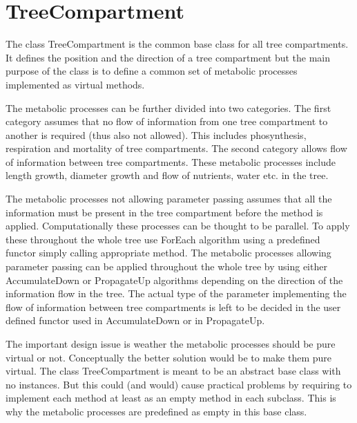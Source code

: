 \section{TreeCompartment}

The class TreeCompartment  is  the  common  base  class for  all  tree
compartments.  It defines  the position and  the direction  of a  tree
compartment but the  main purpose of the class  is to define  a common
set   of metabolic  processes   implemented as   virtual  methods. 

The  metabolic processes can  be further  divided into two categories.
The first category assumes  that no flow of  information from one tree
compartment  to another  is  required (thus also  not  allowed).  This
includes phosynthesis, respiration and mortality of tree compartments.
The   second   category  allows  flow  of   information  between  tree
compartments.   These   metabolic   processes include  length  growth,
diameter growth and flow of nutrients, water etc. in the tree.

The metabolic processes not   allowing parameter passing  assumes that
all the information must be present in the tree compartment before the
method is applied.  Computationally  these processes can be thought to
be parallel.   To apply these  throughout  the whole tree  use ForEach
algorithm using  a   predefined  functor simply calling    appropriate
method.   The  metabolic processes allowing  parameter  passing can be
applied throughout the  whole tree by  using either  AccumulateDown or
PropagateUp algorithms depending on  the direction of  the information
flow in the tree.   The actual type  of the parameter implementing the
flow of information between tree compartments is left to be decided in
the user defined functor used in AccumulateDown or in PropagateUp.

The important design  issue is weather  the metabolic processes should
be pure virtual or not.  Conceptually the better  solution would be to
make them pure virtual.  The class TreeCompartment is  meant to be  an
abstract base  class with  no  instances. But this  could (and  would)
cause practical  problems by requiring   to implement  each method  at
least as an empty method in each  subclass.  This is why the metabolic
processes are predefined as empty in this base class.
  
